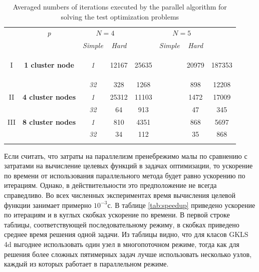 \documentclass[runningheads]{llncs}
\begin{document}
\begin{Russian}
\begin{table}
  \centering
  \caption{Averaged numbers of iterations executed by the parallel algorithm for solving the test optimization problems}
  \label{tab:iterations}
  \begin{tabular}{cccccccc}
    \cline{3-8}\noalign{\smallskip}
    \multicolumn{2}{c}{  } & \textit{p} & \multicolumn{2}{c}{$N=4$} & & \multicolumn{2}{c}{$N=5$}   \\
    \noalign{\smallskip} \cline{4-5} \cline{7-8}  \noalign{\smallskip}
    \multicolumn{2}{c}{  } & & \textit{Simple} & \textit{Hard} & & \textit{Simple} & \textit{Hard}  \\
    \noalign{\smallskip}\hline
    I &
    \parbox{0.25\textwidth}{
    \begin{center}
    \textbf{1 cluster node}
    \end{center}		}
      & \textit{1} & 12167 & 25635 & & 20979 & 187353  \\
    &  & \textit{32} & 328 & 1268  & &   898 & 12208 \\
    \hline \noalign{\smallskip}
II  & \textbf{4 cluster nodes}  %
  & \textit{1} & 25312 & 11103 & & 1472 & 17009 \\
&   & \textit{32} & 64 &   913 & & 47 & 345 \\
    \noalign{\smallskip}\hline	\noalign{\smallskip}
III & \textbf{8 cluster nodes} %
  & \textit{1}  & 810 & 4351 & & 868 & 5697  \\
& & \textit{32} & 34  & 112  & & 35  & 868 \\
    \noalign{\smallskip}\hline
  \end{tabular}
\end{table}

Если считать, что затраты на параллелизм пренебрежимо малы по сравнению с затратами на вычисление целевых функций в задачах оптимизации, то ускорение по времени от использования параллельного метода будет равно ускорению по итерациям. Однако, в действительности это предположение не всегда справедливо. Во всех численных экспериментах время вычисления целевой функции занимает примерно $10^{-3}$с. В таблице \ref{tab:speedup} приведено ускорение по итерациям и в куглых скобках ускорение по времени. В первой строке таблицы, соответствующей последовательному режиму, в скобках приведено среднее время решения одной задачи. Из таблицы видно, что для класов GKLS 4d выгоднее использовать один узел в многопоточном режиме, тогда как для решения более сложных пятимерных задач лучше использовать несколько узлов, каждый из которых работает в параллельном режиме.


\end{Russian}
\end{document}
